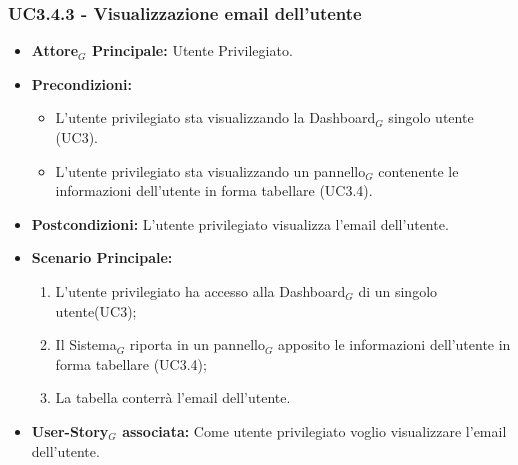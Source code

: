 \documentclass[10pt]{article}
\begin{document}
\begin{justify}
\subsubsection{\textbf{UC3.4.3 - Visualizzazione email dell'utente}}
\label{UC3.4.3}
\begin{itemize}
     \item \textbf{Attore$_G$ Principale:} Utente Privilegiato.
     \item \textbf{Precondizioni:}
        \begin{itemize}
    	\item L'utente privilegiato sta visualizzando la Dashboard$_G$ singolo utente (UC3).
          \item L'utente privilegiato sta visualizzando un pannello$_G$ contenente le informazioni dell'utente in forma tabellare (UC3.4).
        \end{itemize}
      \item \textbf{Postcondizioni:} L'utente privilegiato visualizza l'email dell'utente.
      \item \textbf{Scenario Principale:}
        \begin{enumerate}
            \item L'utente privilegiato ha accesso alla Dashboard$_G$ di un singolo utente(UC3);
            \item Il Sistema$_G$ riporta  in un pannello$_G$ apposito le informazioni dell'utente in forma tabellare (UC3.4);
            \item La tabella conterrà l'email dell'utente.
        \end{enumerate}
     \item \textbf{User-Story$_G$ associata:}
       Come utente privilegiato voglio visualizzare l'email dell'utente.
\end{itemize}


\end{justify}
\end{document}
